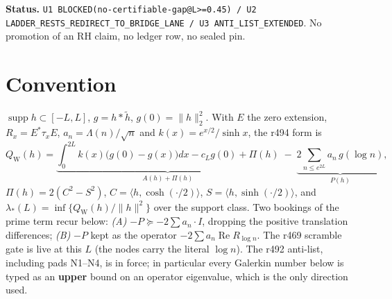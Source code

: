 \documentclass[11pt]{article}
\theoremstyle{remark}
\newcommand{\QW}{Q_{\mathrm W}}
\begin{document}
\medskip\noindent
\textbf{Status.}\enspace
\texttt{U1 BLOCKED(no-certifiable-gap@L>=0.45) /
U2 LADDER\_RESTS\_REDIRECT\_TO\_BRIDGE\_LANE /
U3 ANTI\_LIST\_EXTENDED}.
No promotion of an RH claim, no ledger row, no sealed pin.

\begin{center}
\end{center}

\section{Convention}

$\operatorname{supp}h\subset[-L,L]$, $g=h*\widetilde h$,
$g(0)=\|h\|_2^2$.  With $E$ the zero extension, $R_x=E^*\tau_xE$,
$a_n=\Lambda(n)/\sqrt n$ and $k(x)=e^{x/2}/\sinh x$, the r494 form is
\begin{equation}\label{eq:form}
  \QW(h)=\underbrace{\int_0^{2L}\!k(x)\bigl(g(0)-g(x)\bigr)dx-c_Lg(0)
          +\Pi(h)}_{\textstyle A(h)+\Pi(h)}
         \;-\;\underbrace{2\!\!\sum_{n\le e^{2L}}\!\!a_n\,g(\log n)}
              _{\textstyle P(h)} ,
\end{equation}
$\Pi(h)=2(C^2-S^2)$, $C=\langle h,\cosh(\cdot/2)\rangle$,
$S=\langle h,\sinh(\cdot/2)\rangle$, and
$\lambda_*(L)=\inf\{\QW(h)/\|h\|^2\}$ over the support class.
Two bookings of the prime term recur below:
\emph{(A)} $-P\succeq-2\sum a_n\cdot I$, dropping the positive
translation differences; \emph{(B)} $-P$ kept as the operator
$-2\sum a_n\operatorname{Re}R_{\log n}$.
The r469 scramble gate is live at this $L$ (the nodes carry the
literal $\log n$).  The r492 anti-list, including pads N1--N4, is in
force; in particular every Galerkin number below is typed as an
\textbf{upper} bound on an operator eigenvalue, which is the only
direction used.
\end{document}
